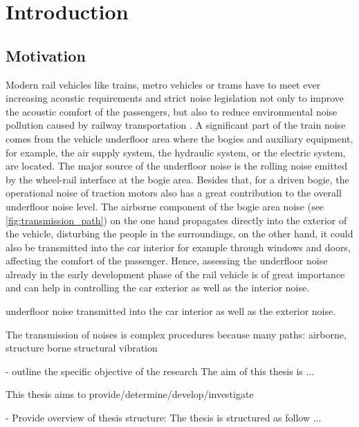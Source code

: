 \chapter{Introduction}
\label{chap:Introduction}

\section{Motivation}

Modern rail vehicles like trains, metro vehicles or trams have to meet ever increasing acoustic requirements and strict noise legislation not only to improve the acoustic comfort of the passengers, but also to reduce environmental noise pollution caused by railway transportation \cite{paozalyte_pollution_2011, li_25d_2021, zhang_sound_2019}.
A significant part of the train noise comes from the vehicle underfloor area where the bogies and auxiliary equipment, for example, the air supply system, the hydraulic system, or the electric system, are located. The major source of the underfloor noise is the rolling noise emitted by the wheel-rail interface at the bogie area. Besides that, for a driven bogie, the operational noise of traction motors also has a great contribution to the overall underfloor noise level.
The airborne component of the bogie area noise (see \cref{fig:transmission_path}) on the one hand propagates directly into the exterior of the vehicle, disturbing the people in the surroundings, on the other hand, it could also be transmitted into the car interior for example through windows and doors, affecting the comfort of the passenger.
%
Hence, assessing the underfloor noise already in the early development phase of the rail vehicle is of great importance and can help in controlling the car exterior as well as the interior noise.


underfloor noise transmitted into the car interior as well as the exterior noise.



The transmission of noises is complex procedures because many paths: airborne, structure borne structural vibration


- outline the specific objective of the research
The aim of this thesis is ...

This thesis aims to provide/determine/develop/investigate

- Provide overview of thesis structure:
The thesis is structured as follow ...


